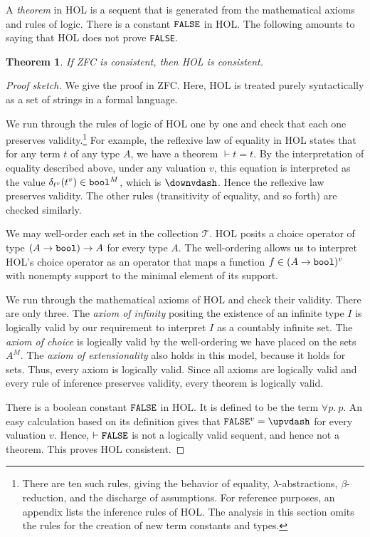 \documentclass[brochure,english,12pt]{bourbaki}
\theoremstyle{plain}
\newtheorem{theorem}[equation]{Theorem}
\def\op#1{{\operatorname{#1}}}
\def\bool{\op{\tt bool}}
\def\T{{\mathcal T}}
\begin{document}
A {\it theorem} in HOL is a sequent that is generated from the
mathematical axioms and rules of logic.  There is a constant ${\tt
  FALSE}$ in HOL.  The following amounts to saying that HOL does not
prove {\tt FALSE}.

\begin{theorem} If ZFC is consistent, then HOL is consistent.
\end{theorem}

\begin{proof}[Proof sketch]
  We give the proof in ZFC.  Here, HOL is treated purely syntactically
  as a set of strings in a formal language.

  We run through the rules of logic of HOL one by one and check that
  each one preserves validity.\footnote{There are ten such rules,
    giving the behavior of equality, $\lambda$-abstractions,
    $\beta$-reduction, and the discharge of assumptions.  For
    reference purposes, an appendix lists the inference rules of HOL.
    The analysis in this section omits the rules for the creation of
    new term constants and types.} For example, the reflexive law of
  equality in HOL states that for any term $t$ of any type $A$, we
  have a theorem $\vdash t = t$.  By the interpretation of equality
  described above, under any valuation $v$, this equation is
  interpreted as the value $\delta_{t^{v}}(t^{v})\in\bool^M$, which is
  $\downvdash $.  Hence the reflexive law preserves validity.  The
  other rules (transitivity of equality, and so forth) are checked
  similarly.

  We may well-order each set in the collection $\T$.  HOL posits a
  choice operator of type $(A\to\bool)\to A$ for every type $A$.  The
  well-ordering allows us to interpret HOL's choice operator as an
  operator that maps a function $f\in (A\to\bool)^v$ with nonempty
  support to the minimal element of its support.

  We run through the mathematical axioms of HOL and check their
  validity.  There are only three.  The {\it axiom of infinity}
  positing the existence of an infinite type $I$ is logically valid by
  our requirement to interpret $I$ as a countably infinite set.  The
  {\it axiom of choice} is logically valid by the well-ordering we
  have placed on the sets $A^M$.  The {\it axiom of extensionality}
  also holds in this model, because it holds for sets.  Thus, every
  axiom is logically valid.  Since all axioms are logically valid and
  every rule of inference preserves validity, every theorem is
  logically valid.

  There is a boolean constant $\op{\tt FALSE}$ in HOL. It is defined
  to be the term $\forall p.~p$.  An easy calculation based on its definition
  gives that $\op{\tt FALSE}^v = \upvdash$ for every valuation $v$.
  Hence, $\vdash \op{\tt FALSE}$ is not a logically valid sequent, and
  hence not a theorem.  This proves HOL consistent.
\end{proof}
\end{document}
